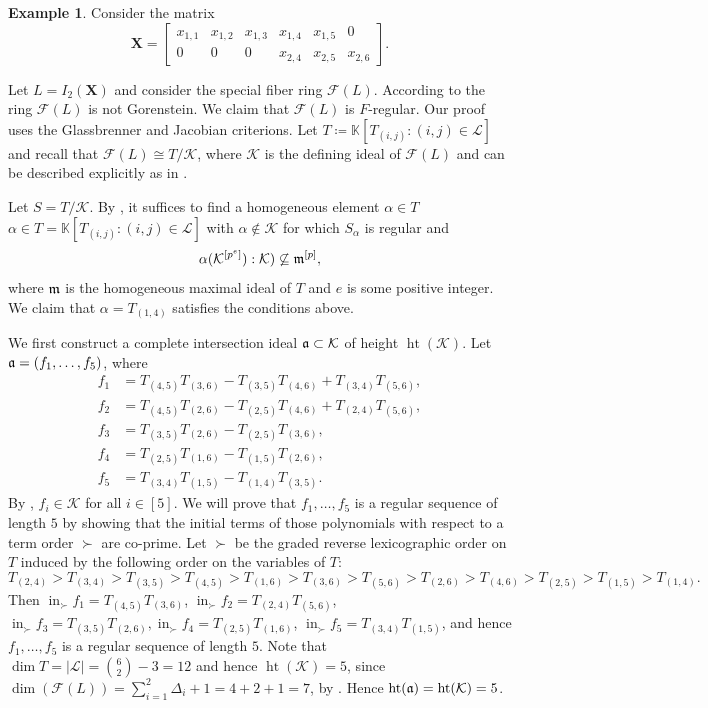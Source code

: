 \documentclass[11pt,a4paper,reqno,dvipsnames]{amsart}
\theoremstyle{plain}
\theoremstyle{definition}
\newtheorem{Assumptions and Discussion}[Theorem]{Assumptions and Discussion}
\newtheorem{Example}[Theorem]{Example}
\theoremstyle{remark}
\def\dim{\operatorname{dim}}
\def\Ht{\operatorname{ht}}
\def\ini{\operatorname{in}}
\newcommand\bfX{\mathbf{X}}
\newcommand\calF{\mathcal{F}}
\newcommand\calK{\mathcal{K}}
\newcommand\calL{\mathcal{L}}
\begin{document}
\begin{Example}\label{ex: F-regular}
    Consider the matrix  
$$\bfX =\begin{bmatrix} 
x_{1,1}  & x_{1,2} &x_{1,3} & x_{1,4} & x_{1,5} & 0\\
 0 & 0  & 0 &x_{2,4} &x_{2,5} & x_{2,6}
  \end{bmatrix}.$$


Let $L=I_2(\bfX)$ and consider the special fiber ring $\calF(L)$. According to  the ring $\calF(L)$ is not Gorenstein. We claim that $\calF(
L)$ is $F$-regular. Our proof uses the Glassbrenner and Jacobian criterions.
Let $T\coloneq\mathbb{K}[T_{(i,j)} : (i,j)\in \calL]$ and recall that $\calF(L)\cong T/\calK$,  where $\calK$ is the defining ideal of $\calF(L)$ and can be described explicitly as in \cite[Theorem~5.5]{LinShenLadder}. 


Let $S=T/\calK$. By \cite[Theorem 3.1]{Glass}, it suffices to find a homogeneous element $\alpha\in T$ $\alpha\in T=\mathbb{K}[T_{(i,j)} : (i,j)\in \calL]$ with $\alpha\notin \calK$ for which $S_{\alpha}$ is regular and $$\alpha(\calK^{[p^e]}):\calK)\not \subseteq \frak{m}^{[p]},$$ where $\frak{m}$ is the homogeneous maximal ideal of $T$ and $e$ is some positive integer. We claim that $\alpha=T_{(1,4)}$ satisfies the conditions above.

We first construct a complete intersection ideal $\frak{a}\subset \calK$ of height $\Ht(\calK)$. Let $\frak{a}=(f_1,\ldots, f_5)$, where 
 \begin{align*}
     f_1&=T_{(4,5)}T_{(3,6)}-T_{(3,5)}T_{(4,6)}+T_{(3,4)}T_{(5,6)},\\
     f_2&= T_{(4,5)}T_{(2,6)}-T_{(2,5)}T_{(4,6)}+T_{(2,4)}T_{(5,6)},\\
     f_3&=T_{(3,5)}T_{(2,6)}-T_{(2,5)}T_{(3,6)},\\
     f_4&=T_{(2,5)}T_{(1,6)}-T_{(1,5)}T_{(2,6)},\\
     f_5&=T_{(3,4)}T_{(1,5)}-T_{(1,4)}T_{(3,5)}.
 \end{align*}
 By \cite[Theorem 5.5]{LinShenLadder}, $f_i\in \calK$ for all $i\in [5]$. We will prove that $f_1,\ldots, f_5$ is a regular sequence of length $5$ by showing that the initial terms of those polynomials with respect to a term order $\succ$ are co-prime.  Let $\succ$ be the graded reverse lexicographic order on $T$ induced by the following order on the variables of $T$:
$$T_{(2,4)}>T_{(3,4)}>T_{(3,5)}>T_{(4,5)}>T_{(1,6)}>T_{(3,6)}>T_{(5,6)}>T_{(2,6)}>T_{(4,6)}>T_{(2,5)}>T_{(1,5)}>T_{(1,4)}.$$ 
 Then 
$\ini_{\succ}f_1=T_{(4,5)}T_{(3,6)}$, $\ini_{\succ}f_2=T_{(2,4)}T_{(5,6)}$, $\ini_{\succ}f_3=T_{(3,5)}T_{(2,6)},\ini_{\succ}f_4=T_{(2,5)}T_{(1,6)}$, $\ini_{\succ}f_5= T_{(3,4)}T_{(1,5)}$, and hence $f_1,\ldots, f_5$ is a regular sequence of length $5$. Note that $\dim T=|\calL|={6 \choose 2}-3=12$ and hence $\Ht(\calK)=5$, since $\dim (\calF(L))=\sum_{i=1}^2 \Delta_i+1=4+2+1=7$, by \cite[Theorem 3.4]{CFGLLLM}. Hence $\Ht(\frak{a})=\Ht(\calK)=5$.


\end{Example}
\end{document}
